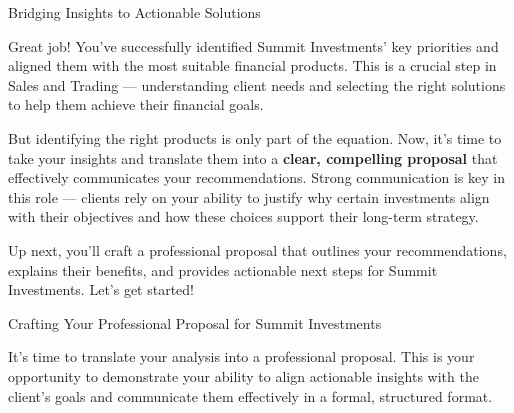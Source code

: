 \documentclass[11pt]{article}
\begin{document}
\newpage
{\fontsize{26}{30}\selectfont Bridging Insights to Actionable Solutions}\par\bigskip

Great job! You've successfully identified Summit Investments' key priorities
and aligned them with the most suitable financial products. This is a crucial
step in Sales and Trading --- understanding client needs and selecting the
right solutions to help them achieve their financial goals.

But identifying the right products is only part of the equation. Now, it's
time to take your insights and translate them into a \textbf{clear,
compelling proposal} that effectively communicates your recommendations.
Strong communication is key in this role --- clients rely on your ability to
justify why certain investments align with their objectives and how these
choices support their long-term strategy.


Up next, you'll craft a professional proposal that outlines your
recommendations, explains their benefits, and provides actionable next steps
for Summit Investments. Let's get started!

\newpage
{\fontsize{26}{30}\selectfont Crafting Your Professional Proposal for Summit Investments}\par\bigskip

It's time to translate your analysis into a professional proposal. This is
your opportunity to demonstrate your ability to align actionable insights with
the client's goals and communicate them effectively in a formal, structured
format.
\end{document}
